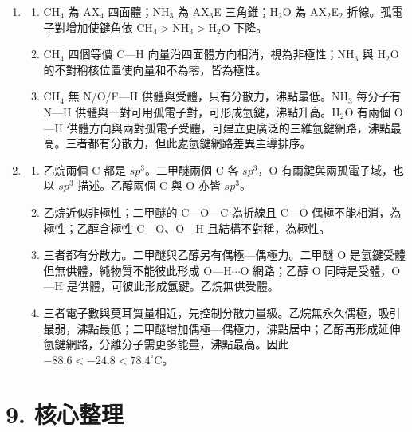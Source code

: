 \documentclass[11pt,a4paper]{article}
\providecommand{\tightlist}{%
  \setlength{\itemsep}{0pt}\setlength{\parskip}{0pt}}
\begin{document}
\begin{enumerate}
\begin{enumerate}
  \end{enumerate}
\item
  \begin{enumerate}
  \def\labelenumii{\arabic{enumii}.}
  \tightlist
  \item
    CH\(_4\) 為 AX\(_4\) 四面體；NH\(_3\) 為 AX\(_3\)E 三角錐；H\(_2\)O 為 AX\(_2\)E\(_2\) 折線。孤電子對增加使鍵角依 CH\(_4>\)NH\(_3>\)H\(_2\)O 下降。
  \item
    CH\(_4\) 四個等價 C---H 向量沿四面體方向相消，視為非極性；NH\(_3\) 與 H\(_2\)O 的不對稱核位置使向量和不為零，皆為極性。
  \item
    CH\(_4\) 無 N/O/F---H 供體與受體，只有分散力，沸點最低。NH\(_3\) 每分子有 N---H 供體與一對可用孤電子對，可形成氫鍵，沸點升高。H\(_2\)O 有兩個 O---H 供體方向與兩對孤電子受體，可建立更廣泛的三維氫鍵網路，沸點最高。三者都有分散力，但此處氫鍵網路差異主導排序。
  \end{enumerate}
\item
  \begin{enumerate}
  \def\labelenumii{\arabic{enumii}.}
  \tightlist
  \item
    乙烷兩個 C 都是 \(sp^3\)。二甲醚兩個 C 各 \(sp^3\)，O 有兩鍵與兩孤電子域，也以 \(sp^3\) 描述。乙醇兩個 C 與 O 亦皆 \(sp^3\)。
  \item
    乙烷近似非極性；二甲醚的 C---O---C 為折線且 C---O 偶極不能相消，為極性；乙醇含極性 C---O、O---H 且結構不對稱，為極性。
  \item
    三者都有分散力。二甲醚與乙醇另有偶極---偶極力。二甲醚 O 是氫鍵受體但無供體，純物質不能彼此形成 O---H\(\cdots\)O 網路；乙醇 O 同時是受體，O---H 是供體，可彼此形成氫鍵。乙烷無供受體。
  \item
    三者電子數與莫耳質量相近，先控制分散力量級。乙烷無永久偶極，吸引最弱，沸點最低；二甲醚增加偶極---偶極力，沸點居中；乙醇再形成延伸氫鍵網路，分離分子需更多能量，沸點最高。因此 \(-88.6<-24.8<78.4^\circ\mathrm C\)。
  \end{enumerate}
\end{enumerate}

\section{9. 核心整理}\label{ux6838ux5fc3ux6574ux7406}
\end{document}
